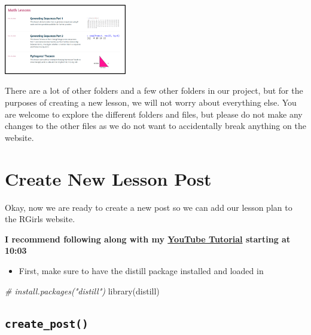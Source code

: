 \documentclass[
]{article}
\newenvironment{Shaded}{\begin{snugshade}}{\end{snugshade}}
\newcommand{\CommentTok}[1]{\textcolor[rgb]{0.56,0.35,0.01}{\textit{#1}}}
\newcommand{\FunctionTok}[1]{\textcolor[rgb]{0.00,0.00,0.00}{#1}}
\newcommand{\NormalTok}[1]{#1}
\providecommand{\tightlist}{%
  \setlength{\itemsep}{0pt}\setlength{\parskip}{0pt}}
\begin{document}
\includegraphics[width=0.4\textwidth,height=\textheight]{images/guide-img-math-lesson.png}

There are a lot of other folders and a few other folders in our project,
but for the purposes of creating a new lesson, we will not worry about
everything else. You are welcome to explore the different folders and
files, but please do not make any changes to the other files as we do
not want to accidentally break anything on the website.

\hypertarget{create-new-lesson-post}{%
\section{Create New Lesson Post}\label{create-new-lesson-post}}

Okay, now we are ready to create a new post so we can add our lesson
plan to the RGirls website.

\textbf{I recommend following along with my
\href{https://www.youtube.com/watch?v=b7TLIX6z1JQ}{YouTube Tutorial}
starting at 10:03}

\begin{itemize}
\tightlist
\item
  First, make sure to have the distill package installed and loaded in
\end{itemize}

\begin{Shaded}
\begin{Highlighting}[]
\CommentTok{\# install.packages("distill")}
\FunctionTok{library}\NormalTok{(distill)}
\end{Highlighting}
\end{Shaded}

\hypertarget{create_post}{%
\subsection{\texorpdfstring{\texttt{create\_post()}}{create\_post()}}\label{create_post}}
\end{document}
